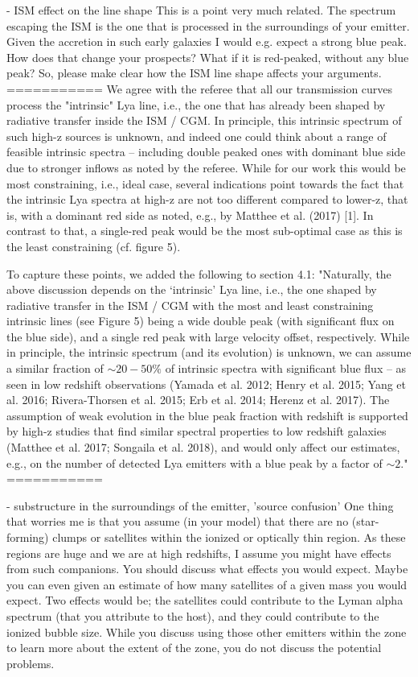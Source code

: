 - ISM effect on the line shape
This is a point very much related. The spectrum escaping the ISM is the one that is processed in the surroundings of your emitter. Given the accretion in such early galaxies I would e.g. expect a strong blue peak. How does that change your prospects? What if it is red-peaked, without any blue peak? So, please make clear how the ISM line shape affects your arguments.
===========
We agree with the referee that all our transmission curves process the "intrinsic" Lya line, i.e., the one that has already been shaped by radiative transfer inside the ISM / CGM. In principle, this intrinsic spectrum of such high-z sources is unknown, and indeed one could think about a range of feasible intrinsic spectra -- including double peaked ones with dominant blue side due to stronger inflows as noted by the referee. While for our work this would be most constraining, i.e., ideal case, several indications point towards the fact that the intrinsic Lya spectra at high-z are not too different compared to lower-z, that is, with a dominant red side as noted, e.g., by Matthee et al. (2017) [1]. In contrast to that, a single-red peak would be the most sub-optimal case as this is the least constraining (cf. figure 5).

To capture these points, we added the following to section 4.1:
"Naturally, the above discussion depends on the `intrinsic' Lya line, i.e., the one shaped by radiative transfer in the ISM / CGM with the most and least constraining intrinsic lines (see Figure 5) being a wide double peak (with significant flux on the blue side), and a single red peak with large velocity offset, respectively. While in principle, the intrinsic spectrum (and its evolution) is unknown, we can assume a similar fraction of $\sim 20-50\%$ of intrinsic spectra with significant blue flux -- as seen in low redshift observations (Yamada et al. 2012; Henry et al. 2015; Yang et al. 2016; Rivera-Thorsen et al. 2015; Erb et al. 2014; Herenz et al. 2017). The assumption of weak evolution in the blue peak fraction with redshift is supported by high-z studies that find similar spectral properties to low redshift galaxies (Matthee et al. 2017; Songaila et al. 2018), and would only affect our estimates, e.g., on the number of detected Lya emitters with a blue peak by a factor of $\sim 2$."
===========

- substructure in the surroundings of the emitter, 'source confusion'
One thing that worries me is that you assume (in your model) that there are no (star-forming) clumps or satellites within the ionized or optically thin region. As these regions are huge and we are at high redshifts, I assume you might have effects from such companions. You should discuss what effects you would expect. Maybe you can even given an estimate of how many satellites of a given mass you would expect. Two effects would be; the satellites could contribute to the Lyman alpha spectrum (that you attribute to the host), and they could contribute to the ionized bubble size. While you discuss using those other emitters within the zone to learn more about the extent of the zone, you do not discuss the potential problems.

